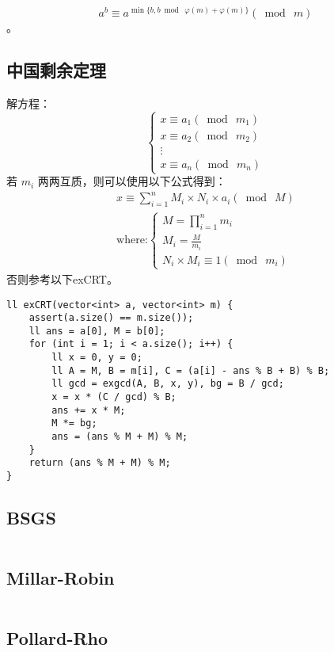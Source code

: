 \documentclass[twoside]{article}
\begin{document}
$$a^b\equiv a^{\min\{b, b \bmod\ \varphi(m)+\varphi(m)\}}(\bmod\ m)$$。\subsection{中国剩余定理}
解方程：
\[
    \begin{cases}
        x\equiv a_1(\bmod\ m_1)\\
        x\equiv a_2(\bmod\ m_2)\\
        \vdots\\
        x\equiv a_n(\bmod\ m_n)
    \end{cases}
\]
若 $m_i$ 两两互质，则可以使用以下公式得到：
\[
\begin{aligned}
    x \equiv \sum_{i=1}^n M_i \times N_i \times a_i (\bmod\ M)\\
    \text{where:}
    \begin{cases}
        M = \prod_{i=1}^n m_i \\
        M_i = \frac{M}{m_i}\\
        N_i \times M_i \equiv 1 (\bmod\ m_i)
    \end{cases}
\end{aligned}
\]
否则参考以下exCRT。
\begin{lstlisting}
ll exCRT(vector<int> a, vector<int> m) {
	assert(a.size() == m.size());
	ll ans = a[0], M = b[0];
	for (int i = 1; i < a.size(); i++) {
		ll x = 0, y = 0;
		ll A = M, B = m[i], C = (a[i] - ans % B + B) % B;
		ll gcd = exgcd(A, B, x, y), bg = B / gcd;
		x = x * (C / gcd) % B;
		ans += x * M;
		M *= bg;
		ans = (ans % M + M) % M;
	}
	return (ans % M + M) % M;
}
\end{lstlisting}
\subsection{BSGS}
\begin{lstlisting}

\end{lstlisting}
\subsection{Millar-Robin}
\begin{lstlisting}

\end{lstlisting}
\subsection{Pollard-Rho}
\begin{lstlisting}

\end{lstlisting}
\end{document}
